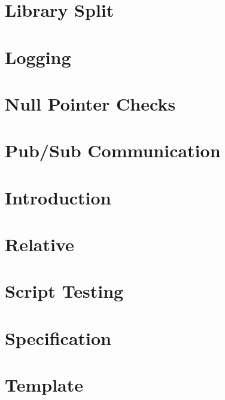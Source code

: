 \documentclass[twoside]{book}
\newcommand{\+}{\discretionary{\mbox{\scriptsize$\hookleftarrow$}}{}{}}
\begin{document}
\chapter{Library Split}
\label{doc_decisions_library_split_md}
\hypertarget{doc_decisions_library_split_md}{}

\chapter{Logging}
\label{doc_decisions_logging_md}
\hypertarget{doc_decisions_logging_md}{}

\chapter{Null Pointer Checks}
\label{doc_decisions_null_pointer_checks_md}
\hypertarget{doc_decisions_null_pointer_checks_md}{}

\chapter{Pub/\+Sub Communication}
\label{doc_decisions_pubsub_md}
\hypertarget{doc_decisions_pubsub_md}{}

\chapter{Introduction}
\label{doc_decisions_README_md}
\hypertarget{doc_decisions_README_md}{}

\chapter{Relative}
\label{doc_decisions_relative_md}
\hypertarget{doc_decisions_relative_md}{}

\chapter{Script Testing}
\label{doc_decisions_script_testing_md}
\hypertarget{doc_decisions_script_testing_md}{}

\chapter{Specification}
\label{doc_decisions_specification_md}
\hypertarget{doc_decisions_specification_md}{}

\chapter{Template}
\label{doc_decisions_template_md}
\hypertarget{doc_decisions_template_md}{}

\end{document}
